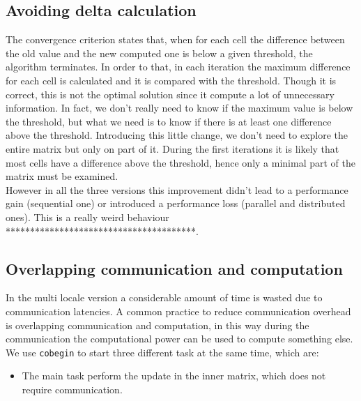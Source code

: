 \documentclass{article}
\begin{document}
\subsection{Avoiding delta calculation}
The convergence criterion states that, when for each cell the difference between the old value and the new computed one is below a given threshold, the algorithm terminates. In order to that, in each iteration the maximum difference for each cell is calculated and it is compared with the threshold. Though it is correct, this is not the optimal solution since it compute a lot of unnecessary information. In fact, we don't really need to know if the maximum value is below the threshold, but what we need is to know if there is at least one difference above the threshold. Introducing this little change, we don't need to explore the entire matrix but only on part of it. During the first iterations it is likely that most cells have a difference above the threshold, hence only a minimal part of the matrix must be examined. \\
However in all the three versions this improvement didn't lead to a performance gain (sequential one) or introduced a performance loss (parallel and distributed ones). This is a really weird behaviour ***************************************.

\subsection{Overlapping communication and computation}
In the multi locale version a considerable amount of time is wasted due to communication latencies. A common practice to reduce communication overhead is overlapping communication and computation, in this way during the communication the computational power can be used to compute something else. \\
We use \texttt{cobegin} to start three different task at the same time, which are:
\begin{itemize}
    \item The main task perform the update in the inner matrix, which does not require communication.

\end{itemize}
\end{document}
